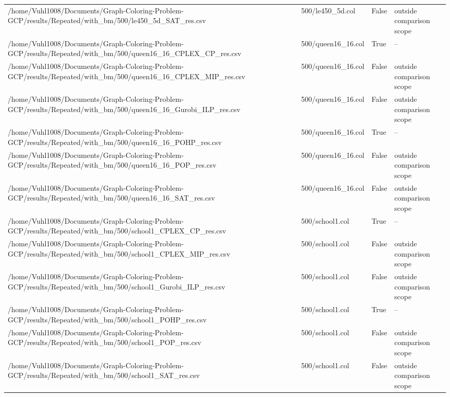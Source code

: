 \begin{table}[htbp]
\begin{tabular}{llll}
/home/Vuhl1008/Documents/Graph-Coloring-Problem-GCP/results/Repeated/with\_bm/500/le450\_5d\_SAT\_res.csv & 500/le450\_5d.col & False & outside comparison scope \\
/home/Vuhl1008/Documents/Graph-Coloring-Problem-GCP/results/Repeated/with\_bm/500/queen16\_16\_CPLEX\_CP\_res.csv & 500/queen16\_16.col & True & -- \\
/home/Vuhl1008/Documents/Graph-Coloring-Problem-GCP/results/Repeated/with\_bm/500/queen16\_16\_CPLEX\_MIP\_res.csv & 500/queen16\_16.col & False & outside comparison scope \\
/home/Vuhl1008/Documents/Graph-Coloring-Problem-GCP/results/Repeated/with\_bm/500/queen16\_16\_Gurobi\_ILP\_res.csv & 500/queen16\_16.col & False & outside comparison scope \\
/home/Vuhl1008/Documents/Graph-Coloring-Problem-GCP/results/Repeated/with\_bm/500/queen16\_16\_POHP\_res.csv & 500/queen16\_16.col & True & -- \\
/home/Vuhl1008/Documents/Graph-Coloring-Problem-GCP/results/Repeated/with\_bm/500/queen16\_16\_POP\_res.csv & 500/queen16\_16.col & False & outside comparison scope \\
/home/Vuhl1008/Documents/Graph-Coloring-Problem-GCP/results/Repeated/with\_bm/500/queen16\_16\_SAT\_res.csv & 500/queen16\_16.col & False & outside comparison scope \\
/home/Vuhl1008/Documents/Graph-Coloring-Problem-GCP/results/Repeated/with\_bm/500/school1\_CPLEX\_CP\_res.csv & 500/school1.col & True & -- \\
/home/Vuhl1008/Documents/Graph-Coloring-Problem-GCP/results/Repeated/with\_bm/500/school1\_CPLEX\_MIP\_res.csv & 500/school1.col & False & outside comparison scope \\
/home/Vuhl1008/Documents/Graph-Coloring-Problem-GCP/results/Repeated/with\_bm/500/school1\_Gurobi\_ILP\_res.csv & 500/school1.col & False & outside comparison scope \\
/home/Vuhl1008/Documents/Graph-Coloring-Problem-GCP/results/Repeated/with\_bm/500/school1\_POHP\_res.csv & 500/school1.col & True & -- \\
/home/Vuhl1008/Documents/Graph-Coloring-Problem-GCP/results/Repeated/with\_bm/500/school1\_POP\_res.csv & 500/school1.col & False & outside comparison scope \\
/home/Vuhl1008/Documents/Graph-Coloring-Problem-GCP/results/Repeated/with\_bm/500/school1\_SAT\_res.csv & 500/school1.col & False & outside comparison scope \\

\end{tabular}
\end{table}
